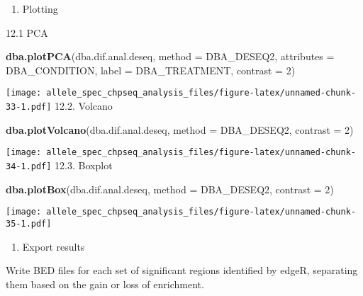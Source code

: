 \documentclass[
]{article}
\newenvironment{Shaded}{\begin{snugshade}}{\end{snugshade}}
\newcommand{\DataTypeTok}[1]{\textcolor[rgb]{0.13,0.29,0.53}{#1}}
\newcommand{\DecValTok}[1]{\textcolor[rgb]{0.00,0.00,0.81}{#1}}
\newcommand{\KeywordTok}[1]{\textcolor[rgb]{0.13,0.29,0.53}{\textbf{#1}}}
\newcommand{\NormalTok}[1]{#1}
\providecommand{\tightlist}{%
  \setlength{\itemsep}{0pt}\setlength{\parskip}{0pt}}
\begin{document}
\begin{enumerate}
\def\labelenumi{\arabic{enumi}.}
\setcounter{enumi}{11}
\tightlist
\item
  Plotting
\end{enumerate}

12.1 PCA

\begin{Shaded}
\begin{Highlighting}[]
\KeywordTok{dba.plotPCA}\NormalTok{(dba.dif.anal.deseq, }\DataTypeTok{method =}\NormalTok{ DBA_DESEQ2, }\DataTypeTok{attributes =}\NormalTok{ DBA_CONDITION, }\DataTypeTok{label =}\NormalTok{ DBA_TREATMENT, }\DataTypeTok{contrast =} \DecValTok{2}\NormalTok{)}
\end{Highlighting}
\end{Shaded}

\texttt{[image: allele\_spec\_chpseq\_analysis\_files/figure-latex/unnamed-chunk-33-1.pdf]}
12.2. Volcano

\begin{Shaded}
\begin{Highlighting}[]
\KeywordTok{dba.plotVolcano}\NormalTok{(dba.dif.anal.deseq, }\DataTypeTok{method =}\NormalTok{ DBA_DESEQ2, }\DataTypeTok{contrast =} \DecValTok{2}\NormalTok{)}
\end{Highlighting}
\end{Shaded}

\texttt{[image: allele\_spec\_chpseq\_analysis\_files/figure-latex/unnamed-chunk-34-1.pdf]}
12.3. Boxplot

\begin{Shaded}
\begin{Highlighting}[]
\KeywordTok{dba.plotBox}\NormalTok{(dba.dif.anal.deseq, }\DataTypeTok{method =}\NormalTok{ DBA_DESEQ2, }\DataTypeTok{contrast =} \DecValTok{2}\NormalTok{)}
\end{Highlighting}
\end{Shaded}

\texttt{[image: allele\_spec\_chpseq\_analysis\_files/figure-latex/unnamed-chunk-35-1.pdf]}

\begin{enumerate}
\def\labelenumi{\arabic{enumi}.}
\setcounter{enumi}{12}
\tightlist
\item
  Export results
\end{enumerate}

Write BED files for each set of significant regions identified by edgeR,
separating them based on the gain or loss of enrichment.
\end{document}

